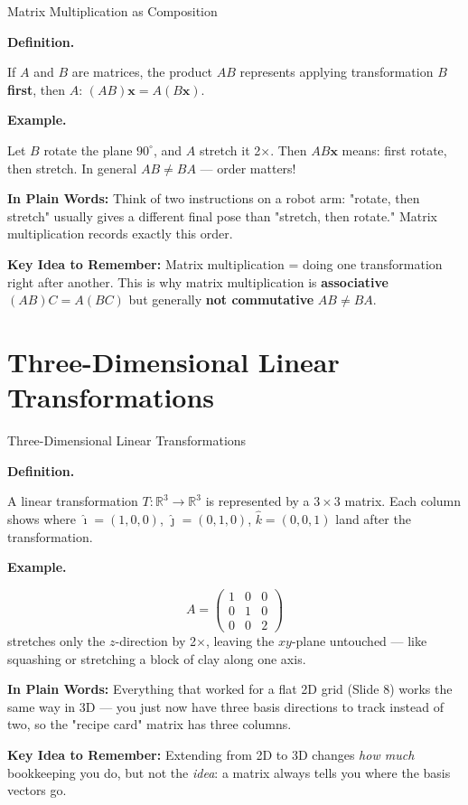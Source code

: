 \documentclass[9pt,aspectratio=169]{beamer}
\newcommand{\keyidea}[1]{%
\par\medskip\noindent\textbf{Key Idea to Remember:} #1\par\medskip}
\newcommand{\childex}[1]{%
\par\medskip\noindent\textbf{In Plain Words:} #1\par\medskip}
\begin{document}
\begin{frame}{Matrix Multiplication as Composition}
\par\noindent\textbf{Definition.}\par
If $A$ and $B$ are matrices, the product $AB$ represents applying transformation $B$
\textbf{first}, then $A$: $(AB)\mathbf{x} = A(B\mathbf{x})$.
\medskip


\par\noindent\textbf{Example.}\par
Let $B$ rotate the plane $90^\circ$, and $A$ stretch it 2$\times$. Then $AB\mathbf{x}$
means: first rotate, then stretch. In general $AB \neq BA$ --- order matters!
\medskip


\childex{Think of two instructions on a robot arm: "rotate, then stretch" usually gives a
different final pose than "stretch, then rotate." Matrix multiplication records exactly
this order.}

\keyidea{Matrix multiplication = doing one transformation right after another. This is why
matrix multiplication is \textbf{associative} $(AB)C=A(BC)$ but generally \textbf{not
commutative} $AB \neq BA$.}
\end{frame}

\section{Three-Dimensional Linear Transformations}

\begin{frame}{Three-Dimensional Linear Transformations}
\small
\par\noindent\textbf{Definition.}\par
A linear transformation $T:\mathbb{R}^3 \to \mathbb{R}^3$ is represented by a $3\times 3$
matrix. Each column shows where $\hat{\imath}=(1,0,0)$, $\hat{\jmath}=(0,1,0)$,
$\hat{k}=(0,0,1)$ land after the transformation.
\medskip


\par\noindent\textbf{Example.}\par
\[
A = \begin{pmatrix} 1&0&0\\0&1&0\\0&0&2\end{pmatrix}
\]
stretches only the $z$-direction by 2$\times$, leaving the $xy$-plane untouched --- like
squashing or stretching a block of clay along one axis.
\medskip


\childex{Everything that worked for a flat 2D grid (Slide 8) works the same way in 3D ---
you just now have three basis directions to track instead of two, so the "recipe card"
matrix has three columns.}

\keyidea{Extending from 2D to 3D changes \emph{how much} bookkeeping you do, but not the
\emph{idea}: a matrix always tells you where the basis vectors go.}
\end{frame}
\end{document}
